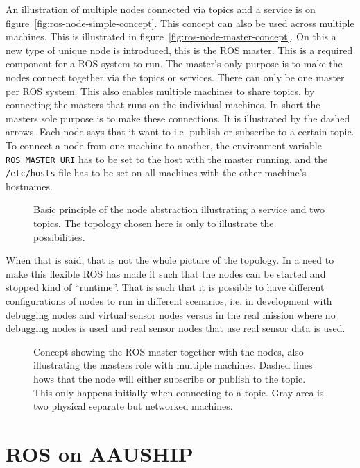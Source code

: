 An illustration of multiple nodes connected via topics and a service
is on figure~\vref{fig:ros-node-simple-concept}. This concept can also
be used across multiple machines. This is illustrated in
figure~\vref{fig:ros-node-master-concept}. On this a new type of unique
node is introduced, this is the \ac{ROS} master. This is a required
component for a ROS system to run. The master's only purpose is to make
the nodes connect together via the topics or services. There can only
be one master per \ac{ROS} system. This also enables multiple machines
to share topics, by connecting the masters that runs on the individual machines. In
short the masters sole purpose is to make these connections. It is
illustrated by the dashed arrows. Each node says that it want to i.e.
publish or subscribe to a certain topic. To connect a node from one
machine to another, the environment variable \texttt{ROS\_MASTER\_URI}
has to be set to the host with the master running, and the
\texttt{/etc/hosts} file has to be set on all machines with the other
machine's hostnames.

\begin{figure}[htbp]
	\centering
	
	\caption{Basic principle of the node abstraction illustrating a
	service and two topics. The topology chosen here is only to illustrate
	the possibilities.}
	\label{fig:ros-node-simple-concept}
\end{figure}

When that is said, that is not the whole picture of the topology. In a
need to make this flexible \ac{ROS} has made it such that the nodes
can be started and stopped kind of ``runtime''. That is such that it is
possible to have different configurations of nodes to run in different
scenarios, i.e. in development with debugging nodes and virtual sensor
nodes versus in the real mission where no debugging nodes is used and
real sensor nodes that use real sensor data is used.

\begin{figure}[htbp]
	\centering
	
	\caption{Concept showing the ROS master together with the nodes,
	also illustrating the masters role with multiple machines. Dashed
	lines hows that the node will either subscribe or publish to the
	topic. This only happens initially when connecting to a topic. Gray
	area is two physical separate but networked machines.}
	\label{fig:ros-node-master-concept}
\end{figure}

\section{ROS on AAUSHIP}

